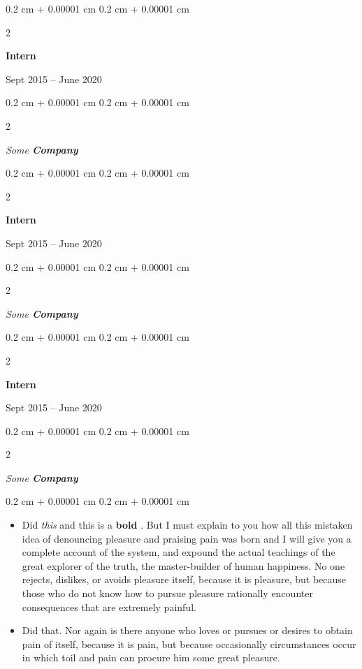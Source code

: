 \documentclass[10pt, letterpaper]{article}
\newenvironment{highlights}{
    \begin{itemize}[
        topsep=0.10 cm,
        parsep=0.10 cm,
        partopsep=0pt,
        itemsep=0pt,
        leftmargin=0.4 cm + 10pt
    ]
}{
    \end{itemize}
} %
\newenvironment{onecolentry}{
    \begin{adjustwidth}{
        0.2 cm + 0.00001 cm
    }{
        0.2 cm + 0.00001 cm
    }
}{
    \end{adjustwidth}
} %
\newenvironment{twocolentry}[2][]{
    \onecolentry
    \def\secondColumn{#2}
    \setcolumnwidth{\fill, 4.5 cm}
    \begin{paracol}{2}
}{
    \switchcolumn \raggedleft \secondColumn
    \end{paracol}
    \endonecolentry
} %
\let\hrefWithoutArrow\href
\renewcommand{\href}[2]{\hrefWithoutArrow{#1}{\ifthenelse{\equal{#2}{}}{ }{#2 }\raisebox{.15ex}{\footnotesize \faExternalLink*}}}
\begin{document}
                \begin{twocolentry}{
                    Sept 2015 – June 2020
                }
                \textbf{Intern}
                \end{twocolentry}
            \begin{twocolentry}{
            }
            \textit{Some \textbf{Company}}
            \end{twocolentry}



        \vspace{0.2 cm}

                \begin{twocolentry}{
                    Sept 2015 – June 2020
                }
                \textbf{Intern}
                \end{twocolentry}
            \begin{twocolentry}{
            }
            \textit{Some \textbf{Company}}
            \end{twocolentry}



        \vspace{0.2 cm}

                \begin{twocolentry}{
                    Sept 2015 – June 2020
                }
                \textbf{Intern}
                \end{twocolentry}
            \begin{twocolentry}{
            }
            \textit{Some \textbf{Company}}
            \end{twocolentry}

        \vspace{0.10 cm}
        \begin{onecolentry}
            \begin{highlights}
                \item Did \textit{this} and this is a \textbf{bold} \href{https://example.com}{link}. But I must explain to you how all this mistaken idea of denouncing pleasure and praising pain was born and I will give you a complete account of the system, and expound the actual teachings of the great explorer of the truth, the master-builder of human happiness. No one rejects, dislikes, or avoids pleasure itself, because it is pleasure, but because those who do not know how to pursue pleasure rationally encounter consequences that are extremely painful.
                \item Did that. Nor again is there anyone who loves or pursues or desires to obtain pain of itself, because it is pain, but because occasionally circumstances occur in which toil and pain can procure him some great pleasure.
            \end{highlights}
        \end{onecolentry}
\end{document}

